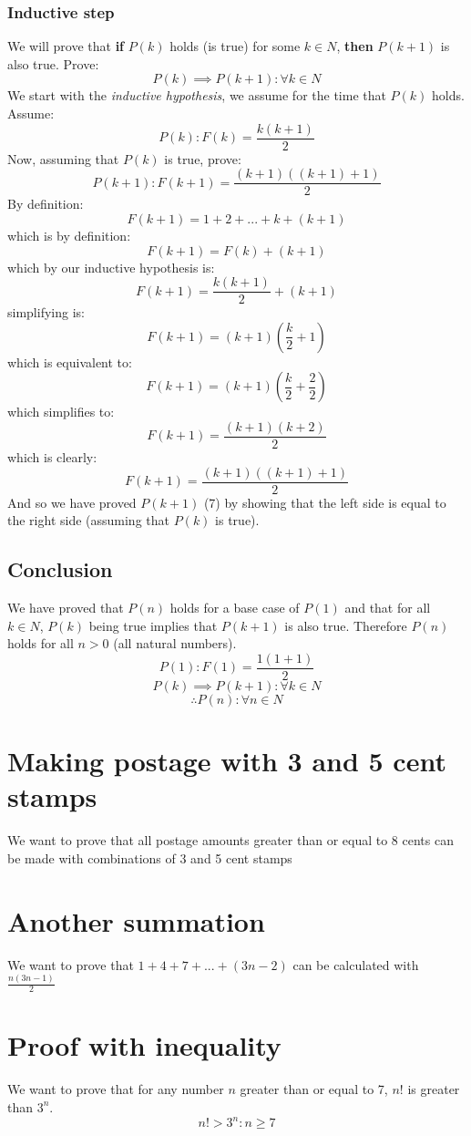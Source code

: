 \documentclass{article}
\begin{document}
\subsubsection{Inductive step}
We will prove that \textbf{if} $P(k)$ holds (is true) for some $k \in N$, \textbf{then} $P(k + 1)$ is also true. Prove:
\begin{equation}
P(k) \implies P(k + 1): \forall k \in N
\end{equation}
We start with the \textit{inductive hypothesis}, we assume for the time that $P(k)$ holds. Assume:
\begin{equation}
P(k): F(k) = \frac{k(k + 1)}{2}
\end{equation}
Now, assuming that $P(k)$ is true, prove:
\begin{equation}
P(k + 1): F(k + 1) = \frac{(k + 1)((k + 1) + 1)}{2}
\end{equation}
By definition:
\[ F(k + 1) = 1 + 2 + ... + k + (k + 1) \]
which is by definition:
\[ F(k + 1) = F(k) + (k + 1) \]
which by our inductive hypothesis is:
\[ F(k + 1) = \frac{k(k + 1)}{2} + (k + 1) \]
simplifying is:
\[ F(k + 1) = (k + 1) (\frac{k}{2} + 1) \]
which is equivalent to:
\[ F(k + 1) = (k + 1) (\frac{k}{2} + \frac{2}{2}) \]
which simplifies to:
\[ F(k + 1) = \frac{(k + 1) (k + 2)}{2} \]
which is clearly:
\[ F(k + 1) = \frac{(k + 1) ((k + 1) + 1)}{2} \]
And so we have proved $P(k + 1)$ (7) by showing that the left side is equal to the right side (assuming that $P(k)$ is true).
\subsection{Conclusion}
We have proved that $P(n)$ holds for a base case of $P(1)$ and that for all $k \in N$, $P(k)$ being true implies that $P(k + 1)$ is also true. Therefore $P(n)$ holds for all $n > 0$ (all natural numbers).
\[P(1): F(1) = \frac{1(1 + 1)}{2}\]
\[P(k) \implies P(k + 1): \forall k \in N \]
\[ \therefore P(n): \forall n \in N \]


\section{Making postage with 3 and 5 cent stamps}
We want to prove that all postage amounts greater than or equal to 8 cents can be made with combinations of 3 and 5 cent stamps


\section{Another summation}
We want to prove that $ 1 + 4 + 7 + ... + (3n - 2) $ can be calculated with $ \frac{n(3n - 1)}{2} $


\section{Proof with inequality}
We want to prove that for any number $n$ greater than or equal to 7, $n!$ is greater than $3^n$.
\[n! > 3^n: n \geq 7 \]
\end{document}

